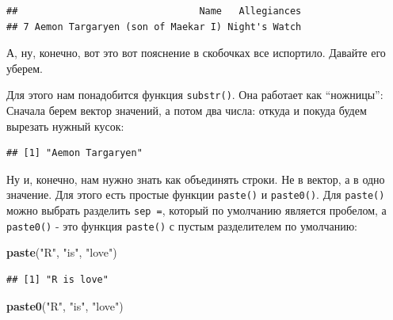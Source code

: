 \documentclass[]{book}
\newenvironment{Shaded}{\begin{snugshade}}{\end{snugshade}}
\newcommand{\KeywordTok}[1]{\textcolor[rgb]{0.13,0.29,0.53}{\textbf{#1}}}
\newcommand{\DecValTok}[1]{\textcolor[rgb]{0.00,0.00,0.81}{#1}}
\newcommand{\StringTok}[1]{\textcolor[rgb]{0.31,0.60,0.02}{#1}}
\newcommand{\OperatorTok}[1]{\textcolor[rgb]{0.81,0.36,0.00}{\textbf{#1}}}
\newcommand{\NormalTok}[1]{#1}
\begin{document}
\begin{verbatim}
##                                Name   Allegiances
## 7 Aemon Targaryen (son of Maekar I) Night's Watch
\end{verbatim}

А, ну, конечно, вот это вот пояснение в скобочках все испортило. Давайте
его уберем.

Для этого нам понадобится функция \texttt{substr()}. Она работает как
``ножницы'': Сначала берем вектор значений, а потом два числа: откуда и
покуда будем вырезать нужный кусок:

\begin{Shaded}
\end{Shaded}

\begin{verbatim}
## [1] "Aemon Targaryen"
\end{verbatim}

\begin{Shaded}
\end{Shaded}

Ну и, конечно, нам нужно знать как объединять строки. Не в вектор, а в
одно значение. Для этого есть простые функции \texttt{paste()} и
\texttt{paste0()}. Для \texttt{paste()} можно выбрать разделить
\texttt{sep\ =}, который по умолчанию является пробелом, а
\texttt{paste0()} - это функция \texttt{paste()} с пустым разделителем
по умолчанию:

\begin{Shaded}
\begin{Highlighting}[]
\KeywordTok{paste}\NormalTok{(}\StringTok{"R"}\NormalTok{, }\StringTok{"is"}\NormalTok{, }\StringTok{"love"}\NormalTok{)}
\end{Highlighting}
\end{Shaded}

\begin{verbatim}
## [1] "R is love"
\end{verbatim}

\begin{Shaded}
\begin{Highlighting}[]
\KeywordTok{paste0}\NormalTok{(}\StringTok{"R"}\NormalTok{, }\StringTok{"is"}\NormalTok{, }\StringTok{"love"}\NormalTok{)}
\end{Highlighting}
\end{Shaded}
\end{document}
